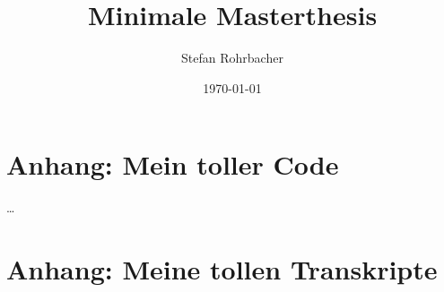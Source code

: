 \documentclass[a4paper]{article}
\title{Minimale Masterthesis}
\author{Stefan Rohrbacher}
\date{\today}
\begin{document}


\addtocounter{page}{-1} %

\newpage
\tableofcontents
\newpage
\listoffigures
\newpage
\listoftables
\newpage








\printbibliography
\newpage

\begin{appendix}
	\section{Anhang: Mein toller Code}
	\ldots
	\newpage
	\section{Anhang: Meine tollen Transkripte}
\end{appendix}
\end{document}
